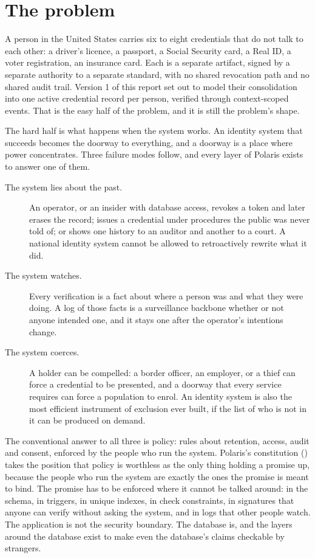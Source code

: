 \section{The problem}
\label{sec:problem}

A person in the United States carries six to eight credentials that do not talk to each other:
a driver's licence, a passport, a Social Security card, a Real ID, a voter registration, an
insurance card. Each is a separate artifact, signed by a separate authority to a separate standard,
with no shared revocation path and no shared audit trail. Version 1 of this report set out to model
their consolidation into one active credential record per person, verified through context-scoped
events. That is the easy half of the problem, and it is still the problem's shape.

The hard half is what happens when the system works. An identity system that succeeds becomes the
doorway to everything, and a doorway is a place where power concentrates. Three failure modes
follow, and every layer of Polaris exists to answer one of them.

\begin{description}
  \item[The system lies about the past.] An operator, or an insider with database access,
    revokes a token and later erases the record; issues a credential under procedures the public
    was never told of; or shows one history to an auditor and another to a court. A national
    identity system cannot be allowed to retroactively rewrite what it did.
  \item[The system watches.] Every verification is a fact about where a person was and what they
    were doing. A log of those facts is a surveillance backbone whether or not anyone intended one,
    and it stays one after the operator's intentions change.
  \item[The system coerces.] A holder can be compelled: a border officer, an employer, or a
    thief can force a credential to be presented, and a doorway that every service requires can
    force a population to enrol. An identity system is also the most efficient instrument of
    exclusion ever built, if the list of who is not in it can be produced on demand.
\end{description}

The conventional answer to all three is policy: rules about retention, access, audit and consent,
enforced by the people who run the system. Polaris's constitution () takes the
position that policy is worthless as the only thing holding a promise up, because the people who
run the system are exactly the ones the promise is meant to bind. The promise has to be enforced
where it cannot be talked around: in the schema, in triggers, in unique indexes, in check
constraints, in signatures that anyone can verify without asking the system, and in logs that other
people watch. The application is not the security boundary. The database is, and the layers around
the database exist to make even the database's claims checkable by strangers.


